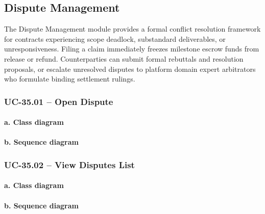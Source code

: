 
\subsection{Dispute Management}

The Dispute Management module provides a formal conflict resolution framework for contracts experiencing scope deadlock, substandard deliverables, or unresponsiveness. Filing a claim immediately freezes milestone escrow funds from release or refund. Counterparties can submit formal rebuttals and resolution proposals, or escalate unresolved disputes to platform domain expert arbitrators who formulate binding settlement rulings.

\subsubsection{UC-35.01 -- Open Dispute}

\paragraph*{a. Class diagram}

\paragraph*{b. Sequence diagram}

\subsubsection{UC-35.02 -- View Disputes List}

\paragraph*{a. Class diagram}

\paragraph*{b. Sequence diagram}

